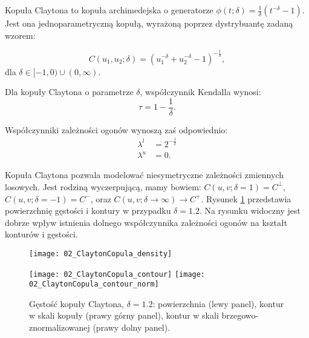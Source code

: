 \begin{df}
	Kopuła Claytona to kopuła archimedejska o generatorze $\phi(t;\delta) = \frac{1}{\delta}(t^{-\delta}-1)$. Jest ona jednoparametryczną kopułą, wyrażoną poprzez dystrybuantę zadaną wzorem:
	
	$$ C(u_1, u_2; \delta) = (u_1 ^{-\delta} + u_2^{-\delta} - 1)^{-\frac{1}{\delta}},$$
	dla $\delta \in [-1, 0) \cup (0, \infty).$
\end{df}
\begin{prop}
	Dla kopuły Claytona o parametrze $\delta$, współczynnik Kendalla wynosi:
	$$ \tau = 1 - \frac{1}{\delta}.$$
	
	Współczynniki zależności ogonów wynoszą zaś odpowiednio:
	\begin{equation}
		\begin{split}
			\lambda^{l}&=2^{-\frac{1}{\delta}} \\
			\lambda^{u}&=0.
		\end{split}
	\end{equation}
\end{prop}
Kopuła Claytona pozwala modelować niesymetryczne zależności zmiennych losowych. Jest rodziną wyczerpującą, mamy bowiem: $C(u,v;\delta = 1) = C^{\perp}$, $C(u,v;\delta = -1) = C^{-}$, oraz $C(u,v;\delta \to \infty) \to C^{+}$. Rysunek \ref{fig:clayton_copula_density} przedstawia powierzchnię gęstości i kontury w przypadku $\delta = 1.2$. Na rysunku widoczny jest dobrze wpływ istnienia dolnego współczynnika zależności ogonów na kształt konturów i gęstości.

\begin{figure}[h]
	\centering
	\begin{minipage}{0.5\linewidth}
		\texttt{[image: 02\_ClaytonCopula\_density]}
	\end{minipage}
	\begin{minipage}{0.45\linewidth}
		\texttt{[image: 02\_ClaytonCopula\_contour]}
		\texttt{[image: 02\_ClaytonCopula\_contour\_norm]}
	\end{minipage}
	\caption{Gęstość kopuły Claytona, $\delta = 1.2$: powierzchnia (lewy panel), kontur w skali kopuły (prawy górny panel), kontur w skali brzegowo-znormalizowanej (prawy dolny panel). \label{fig:clayton_copula_density}}
\end{figure}

